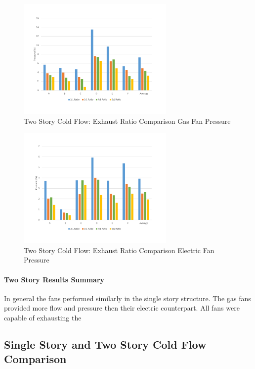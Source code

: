 \documentclass{article}
\begin{document}
\begin{figure}[H]
	\centering
	\includegraphics[width=3in]{0_Images/ColdFlow/Two_Story/RatioPressureGas.pdf}
	\caption{Two Story Cold Flow: Exhaust Ratio Comparison Gas Fan Pressure}
	\label{fig:RatioPressure2StoryGas}
\end{figure}

\begin{figure}[H]
	\centering
	\includegraphics[width=3in]{0_Images/ColdFlow/Two_Story/RatioPressureEle.pdf}
	\caption{Two Story Cold Flow: Exhaust Ratio Comparison Electric Fan Pressure}
	\label{fig:RatioPressure2StoryEle}
\end{figure}

\paragraph{Two Story Results Summary} \mbox{}

In general the fans performed similarly in the single story structure. The gas fans provided more flow and pressure then their electric counterpart. All fans were capable of exhausting the 

\subsection{Single Story and Two Story Cold Flow Comparison}
\end{document}
